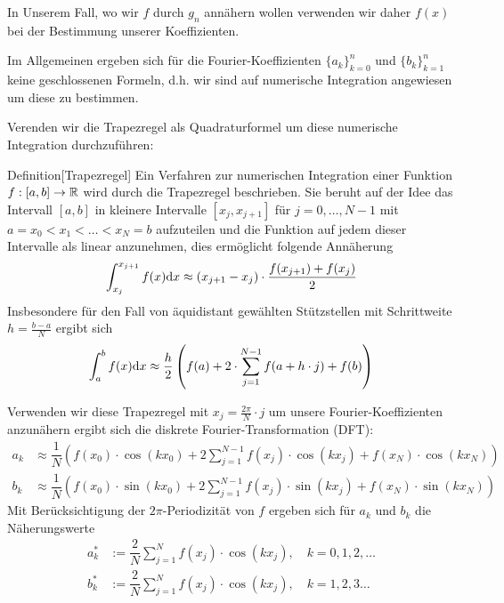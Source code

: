 In Unserem Fall, wo wir $f$ durch $g_n$ annähern wollen verwenden wir daher $f(x)$ bei der Bestimmung unserer 
Koeffizienten.

Im Allgemeinen ergeben sich für die Fourier-Koeffizienten $\{a_k\}_{k=0}^n$ und $\{b_k\}_{k=1}^n$ keine geschlossenen 
Formeln, d.h. wir sind auf numerische Integration angewiesen um diese zu bestimmen.

Verenden wir die Trapezregel als Quadraturformel um diese numerische Integration durchzuführen:

\begin{colbox}{Definition}[Trapezregel]
  Ein Verfahren zur numerischen Integration einer Funktion $f:[a,b]\to\mathbb R$ wird durch die Trapezregel beschrieben. Sie 
  beruht auf der Idee das Intervall $[a,b]$ in kleinere Intervalle $[x_j, x_{j+1}]$ für $j=0,\dots,N-1$ mit 
  $a=x_0<x_1<\dots<x_N=b$ aufzuteilen und die Funktion auf jedem dieser Intervalle als linear anzunehmen, 
  dies ermöglicht folgende Annäherung 
  \begin{align*}
    \int_{x_j}^{x_{j+1}} f(x) \text{d} x \approx (x_{j+1}-x_j)\cdot\dfrac{f(x_{j+1})+f(x_j)}{2}
  \end{align*}
  Insbesondere für den Fall von äquidistant gewählten Stützstellen mit Schrittweite $h=\tfrac{b-a}{N}$ ergibt sich
  \begin{align*}
    \int_{a}^{b} f(x) \text{d} x \approx \dfrac{h}{2}\left(f(a) + 2\cdot\sum_{j=1}^{N-1}f(a + h\cdot j) + f(b) \right)
  \end{align*}
\end{colbox}

Verwenden wir diese Trapezregel mit $x_j=\tfrac{2\pi}{N}\cdot j$ um unsere Fourier-Koeffizienten anzunähern 
ergibt sich die diskrete Fourier-Transformation (DFT):
%
\begin{align*}
  a_k &\approx\dfrac{1}{N}\left(f(x_0)\cdot\cos(kx_0) 
  + 2\sum_{j=1}^{N-1} f(x_j)\cdot\cos(kx_j) + f(x_N)\cdot \cos(kx_N)\right) \\
  b_k &\approx\dfrac{1}{N}\left(f(x_0)\cdot\sin(kx_0)  
  + 2\sum_{j=1}^{N-1} f(x_j)\cdot\sin(kx_j) + f(x_N)\cdot \sin(kx_N)\right)
\end{align*}
%
Mit Berücksichtigung der $2\pi$-Periodizität von $f$ ergeben sich für $a_k$ und $b_k$ die Näherungswerte
%
\begin{align*}
  a_k^* &:= \dfrac{2}{N}\sum_{j=1}^N f(x_j)\cdot \cos(kx_j), \quad k=0,1,2,\dots \\
  b_k^* &:= \dfrac{2}{N}\sum_{j=1}^N f(x_j)\cdot \cos(kx_j), \quad k=1,2,3\dots
\end{align*}

